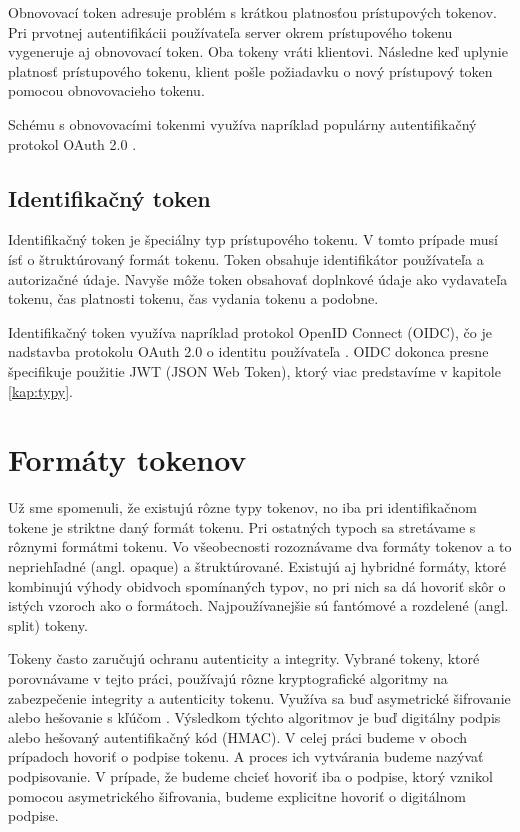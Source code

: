 Obnovovací token adresuje problém s krátkou platnosťou prístupových tokenov. Pri prvotnej autentifikácii používateľa server okrem prístupového tokenu vygeneruje aj obnovovací token. Oba tokeny vráti klientovi. Následne keď uplynie platnosť prístupového tokenu, klient pošle požiadavku o nový prístupový token pomocou obnovovacieho tokenu. 

Schému s obnovovacími tokenmi využíva napríklad populárny autentifikačný protokol OAuth 2.0 \cite{oauth2}.


\subsection{Identifikačný token}

Identifikačný token je špeciálny typ prístupového tokenu. V tomto prípade musí ísť o štruktúrovaný formát tokenu. Token obsahuje identifikátor používateľa a autorizačné údaje. Navyše môže token obsahovať doplnkové údaje ako vydavateľa tokenu, čas platnosti tokenu, čas vydania tokenu a podobne.

Identifikačný token využíva napríklad protokol OpenID Connect (OIDC), čo je nadstavba protokolu OAuth 2.0 o identitu používateľa \cite{oidc}. OIDC dokonca presne špecifikuje použitie JWT (JSON Web Token), ktorý viac predstavíme v kapitole \ref{kap:typy}.


\section{Formáty tokenov}
\label{sec:formats}

Už sme spomenuli, že existujú rôzne typy tokenov, no iba pri identifikačnom tokene je striktne daný formát tokenu. Pri ostatných typoch sa stretávame s rôznymi formátmi tokenu. Vo všeobecnosti rozoznávame dva formáty tokenov a to nepriehľadné (angl. opaque) a štruktúrované. Existujú aj hybridné formáty, ktoré kombinujú výhody obidvoch spomínaných typov, no pri nich sa dá hovoriť skôr o istých vzoroch ako o formátoch. Najpoužívanejšie sú fantómové a rozdelené (angl. split) tokeny.

Tokeny často zaručujú ochranu autenticity a integrity. Vybrané tokeny, ktoré porovnávame v tejto práci, používajú rôzne kryptografické algoritmy na zabezpečenie integrity a autenticity tokenu. Využíva sa buď asymetrické šifrovanie alebo hešovanie s kľúčom \cite{hmac_povodny}. Výsledkom týchto algoritmov je buď digitálny podpis alebo hešovaný autentifikačný kód (HMAC). V celej práci budeme v oboch prípadoch hovoriť o podpise tokenu. A proces ich vytvárania budeme nazývať podpisovanie. V prípade, že budeme chcieť hovoriť iba o podpise, ktorý vznikol pomocou asymetrického šifrovania, budeme explicitne hovoriť o digitálnom podpise.


